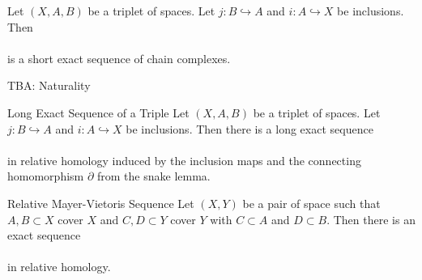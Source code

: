 \documentclass[a4paper]{article}
\begin{document}
\begin{prp}{}{} Let $(X,A,B)$ be a triplet of spaces. Let $j:B\hookrightarrow A$ and $i:A\hookrightarrow X$ be inclusions. Then \\
\\
is a short exact sequence of chain complexes. 
\end{prp}

TBA: Naturality

\begin{prp}{Long Exact Sequence of a Triple}{} Let $(X,A,B)$ be a triplet of spaces. Let $j:B\hookrightarrow A$ and $i:A\hookrightarrow X$ be inclusions. Then there is a long exact sequence \\
\\
in relative homology induced by the inclusion maps and the connecting homomorphism $\partial$ from the snake lemma. 
\end{prp}

\begin{thm}{Relative Mayer-Vietoris Sequence}{} Let $(X,Y)$ be a pair of space such that $A,B\subset X$ cover $X$ and $C,D\subset Y$ cover $Y$ with $C\subset A$ and $D\subset B$. Then there is an exact sequence \\
\\
in relative homology. 
\end{thm}
\end{document}
